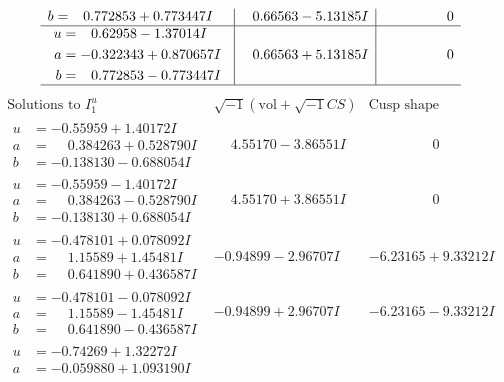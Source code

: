 \documentclass[1p]{elsarticle_modified}
\theoremstyle{definition}
\newcommand{\I}{\sqrt{-1}}
\begin{document}
$$\begin{array}{c|c|c}
\begin{aligned}
b &= \phantom{-}0.772853 + 0.773447 I\end{aligned}
 & \phantom{-}0.66563 - 5.13185 I & \phantom{-0.000000 } 0 \\ \hline\begin{aligned}
u &= \phantom{-}0.62958 - 1.37014 I \\
a &= -0.322343 + 0.870657 I \\
b &= \phantom{-}0.772853 - 0.773447 I\end{aligned}
 & \phantom{-}0.66563 + 5.13185 I & \phantom{-0.000000 } 0\\
 \hline 
 \end{array}$$\newpage$$\begin{array}{c|c|c}  
\text{Solutions to }I^u_{1}& \I (\text{vol} + \sqrt{-1}CS) & \text{Cusp shape}\\
 \hline 
\begin{aligned}
u &= -0.55959 + 1.40172 I \\
a &= \phantom{-}0.384263 + 0.528790 I \\
b &= -0.138130 - 0.688054 I\end{aligned}
 & \phantom{-}4.55170 - 3.86551 I & \phantom{-0.000000 } 0 \\ \hline\begin{aligned}
u &= -0.55959 - 1.40172 I \\
a &= \phantom{-}0.384263 - 0.528790 I \\
b &= -0.138130 + 0.688054 I\end{aligned}
 & \phantom{-}4.55170 + 3.86551 I & \phantom{-0.000000 } 0 \\ \hline\begin{aligned}
u &= -0.478101 + 0.078092 I \\
a &= \phantom{-}1.15589 + 1.45481 I \\
b &= \phantom{-}0.641890 + 0.436587 I\end{aligned}
 & -0.94899 - 2.96707 I & -6.23165 + 9.33212 I \\ \hline\begin{aligned}
u &= -0.478101 - 0.078092 I \\
a &= \phantom{-}1.15589 - 1.45481 I \\
b &= \phantom{-}0.641890 - 0.436587 I\end{aligned}
 & -0.94899 + 2.96707 I & -6.23165 - 9.33212 I \\ \hline\begin{aligned}
u &= -0.74269 + 1.32272 I \\
a &= -0.059880 + 1.093190 I \\

\end{aligned}
\end{array}$$
\end{document}
